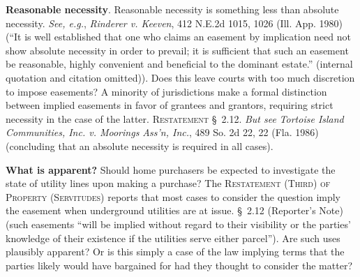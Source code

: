 \item \textbf{Reasonable necessity}. Reasonable necessity is something less than
absolute necessity. \textit{See, e.g.}, \emph{Rinderer v. Keeven}, 412 N.E.2d
1015, 1026 (Ill. App. 1980) (``It is well established that one who claims an
easement by implication need not show absolute necessity in order to prevail; it
is sufficient that such an easement be reasonable, highly convenient and
beneficial to the dominant estate.'' (internal quotation and citation omitted)).
Does this leave courts with too much discretion to impose easements? A minority
of jurisdictions make a formal distinction between implied easements in favor of
grantees and grantors, requiring strict necessity in the case of the latter.
\textsc{Restatement} \S~2.12. \textit{But see} \emph{Tortoise Island
Communities, Inc. v. Moorings Ass'n, Inc.}, 489 So. 2d 22, 22 (Fla. 1986)
(concluding that an absolute necessity is required in all cases). 


\item \textbf{What is apparent?} Should home purchasers be expected to
investigate the state of utility lines upon making a purchase? The
\textsc{Restatement (Third) of Property (Servitudes)} reports that most cases to
consider the question imply the easement when underground utilities are at
issue. \S~2.12 (Reporter's Note) (such easements ``will be implied without
regard to their visibility or the parties' knowledge of their existence if the
utilities serve either parcel''). Are such uses plausibly apparent? Or is this
simply a case of the law implying terms that the parties likely would have
bargained for had they thought to consider the matter?

